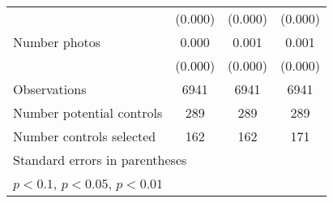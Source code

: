 {\begin{tabular}{l*{3}{c}}
                    &     (0.000)         &     (0.000)         &     (0.000)         \\
[1em]
Number photos       &       0.000\sym{***}&       0.001\sym{***}&       0.001\sym{***}\\
                    &     (0.000)         &     (0.000)         &     (0.000)         \\
\hline
Observations        &        6941         &        6941         &        6941         \\
Number potential controls&         289         &         289         &         289         \\
Number controls selected&         162         &         162         &         171         \\
\hline\hline
\multicolumn{4}{l}{\footnotesize Standard errors in parentheses}\\
\multicolumn{4}{l}{\footnotesize \sym{*} \(p<0.1\), \sym{**} \(p<0.05\), \sym{***} \(p<0.01\)}\\
\end{tabular}
}
